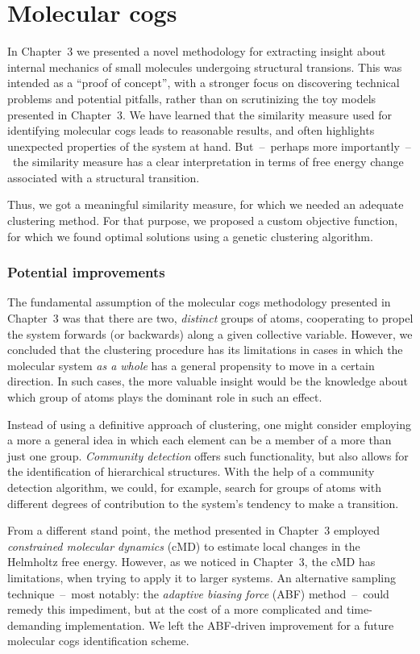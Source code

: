 \documentclass[a4paper,11pt,twoside]{book}%
\begin{document}
\section{Molecular cogs}

In Chapter~3 we presented a novel methodology for extracting insight about internal mechanics of small molecules undergoing structural transions.
This was intended as a ``proof of concept'', with a stronger focus on discovering technical problems and potential pitfalls, rather than on scrutinizing the toy models presented in Chapter~3.
We have learned that the similarity measure used for identifying molecular cogs leads to reasonable results, and often highlights unexpected properties of the system at hand.
But~--~perhaps more importantly~--~the similarity measure has a clear interpretation in terms of free energy change associated with a structural transition.

Thus, we got a meaningful similarity measure, for which we needed an adequate clustering method.
For that purpose, we proposed a custom objective function, for which we found optimal solutions using a genetic clustering algorithm.

\subsubsection{Potential improvements}

The fundamental assumption of the molecular cogs methodology presented in Chapter~3 was that there are two, \emph{distinct} groups of atoms, cooperating to propel the system forwards (or backwards) along a given collective variable.
However, we concluded that the clustering procedure has its limitations in cases in which the molecular system \emph{as a whole} has a general propensity to move in a certain direction.
In such cases, the more valuable insight would be the knowledge about which group of atoms plays the dominant role in such an effect.

Instead of using a definitive approach of clustering, one might consider employing a more a general idea in which each element can be a member of a more than just one group.
\emph{Community detection} offers such functionality, but also allows for the identification of hierarchical structures.
With the help of a community detection algorithm, we could, for example, search for groups of atoms with different degrees of contribution to the system's tendency to make a transition.

From a different stand point, the method presented in Chapter~3 employed \emph{constrained molecular dynamics} (cMD) to estimate local changes in the Helmholtz free energy.
However, as we noticed in Chapter~3, the cMD has limitations, when trying to apply it to larger systems.
An alternative sampling technique~--~most notably: the \emph{adaptive biasing force} (ABF) method~--~could remedy this impediment, but at the cost of a more complicated and time-demanding implementation.
We left the ABF-driven improvement for a future molecular cogs identification scheme.
\end{document}

